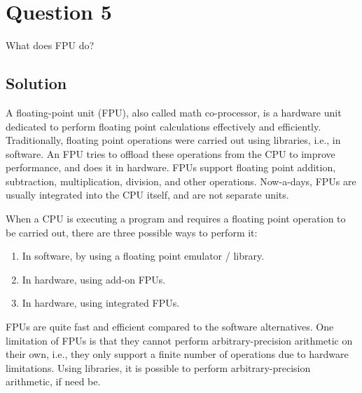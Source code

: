 \section*{Question 5}

What does FPU do?

\subsection*{Solution}

A floating-point unit (FPU), also called math co-processor, is a hardware unit dedicated to perform floating point calculations effectively and efficiently.
Traditionally, floating point operations were carried out using libraries, i.e., in software.
An FPU tries to offload these operations from the CPU to improve performance, and does it in hardware.
FPUs support floating point addition, subtraction, multiplication, division, and other operations.
Now-a-days, FPUs are usually integrated into the CPU itself, and are not separate units.

When a CPU is executing a program and requires a floating point operation to be carried out, there are three possible ways to perform it:
\begin{enumerate}[itemsep=3pt,parsep=0pt,topsep=5pt,partopsep=0pt]
    \item In software, by using a floating point emulator / library.
    \item In hardware, using add-on FPUs.
    \item In hardware, using integrated FPUs.
\end{enumerate}

FPUs are quite fast and efficient compared to the software alternatives.
One limitation of FPUs is that they cannot perform arbitrary-precision arithmetic on their own, i.e., they only support a finite number of operations due to hardware limitations.
Using libraries, it is possible to perform arbitrary-precision arithmetic, if need be.
